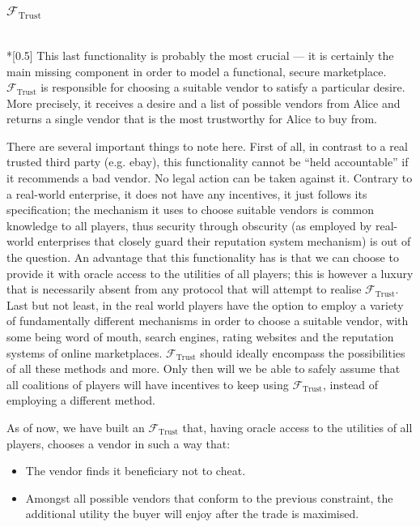 \subsubsection{$\mathcal{F}_{\mathrm{Trust}}$} \ \\*[0.5\baselineskip]
  This last functionality is probably the most crucial --- it is certainly the main
  missing component in order to model a functional, secure marketplace.
  $\mathcal{F}_{\mathrm{Trust}}$ is responsible for choosing a suitable vendor to satisfy
  a particular desire. More precisely, it receives a desire and a list of possible vendors
  from Alice and returns a single vendor that is the most trustworthy for Alice to buy
  from.

  There are several important things to note here. First of all, in contrast to a real
  trusted third party (e.g. ebay), this functionality cannot be ``held accountable'' if it
  recommends a bad vendor. No legal action can be taken against it. Contrary to a
  real-world enterprise, it does not have any incentives, it just follows its
  specification; the mechanism it uses to choose suitable vendors is common knowledge to
  all players, thus security through obscurity (as employed by real-world enterprises that
  closely guard their reputation system mechanism) is out of the question. An advantage
  that this functionality has is that we can choose to provide it with oracle access to
  the utilities of all players; this is however a luxury that is necessarily absent from
  any protocol that will attempt to realise $\mathcal{F}_{\mathrm{Trust}}$. Last but not
  least, in the real world players have the option to employ a variety of fundamentally
  different mechanisms in order to choose a suitable vendor, with some being word of
  mouth, search engines, rating websites and the reputation systems of online
  marketplaces. $\mathcal{F}_{\mathrm{Trust}}$ should ideally encompass the possibilities
  of all these methods and more. Only then will we be able to safely assume that all
  coalitions of players will have incentives to keep using $\mathcal{F}_{\mathrm{Trust}}$,
  instead of employing a different method.

  As of now, we have built an $\mathcal{F}_{\mathrm{Trust}}$ that, having oracle access to
  the utilities of all players, chooses a vendor in such a way that:
  \begin{itemize}
    \item The vendor finds it beneficiary not to cheat.
    \item Amongst all possible vendors that conform to the previous constraint, the
    additional utility the buyer will enjoy after the trade is maximised.
  \end{itemize}
